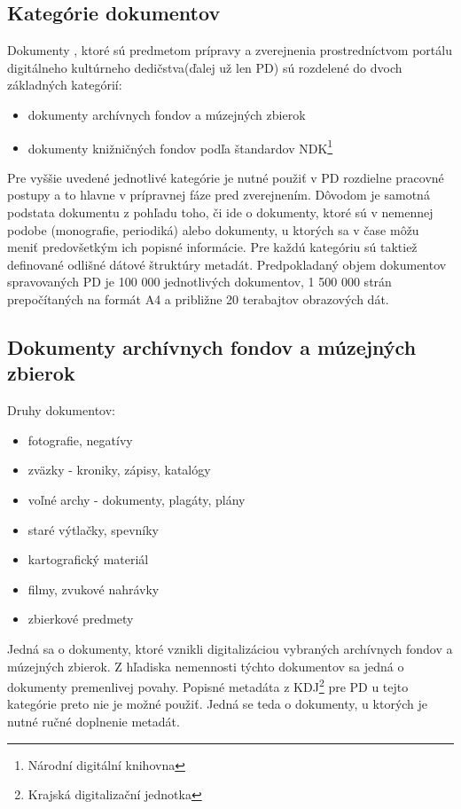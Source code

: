 \documentclass[
  digital, %
  table,   %
  lof,     %
  lot,     %
]{fithesis3}
\begin{document}
\subsection{Kategórie dokumentov}
Dokumenty , ktoré sú predmetom prípravy a zverejnenia prostredníctvom portálu digitálneho kultúrneho dedičstva(ďalej už len PD) sú rozdelené do dvoch základných kategórií:
\begin{itemize}
	\item dokumenty archívnych fondov a múzejných zbierok				
	\item dokumenty knižničných fondov podľa štandardov NDK\footnote{Národní digitální knihovna}
\end{itemize}
Pre vyššie uvedené jednotlivé kategórie je nutné použiť v PD rozdielne pracovné postupy a to hlavne v prípravnej fáze pred zverejnením. Dôvodom je samotná podstata dokumentu z pohľadu toho, či ide o dokumenty, ktoré sú v nemennej podobe (monografie, periodiká) alebo dokumenty, u ktorých sa v čase môžu meniť predovšetkým ich popisné informácie. Pre každú kategóriu sú taktiež definované odlišné dátové štruktúry metadát. Predpokladaný objem dokumentov spravovaných PD je 100 000 jednotlivých dokumentov, 1 500 000 strán prepočítaných na formát A4 a približne 20 terabajtov obrazových dát.
\subsection{Dokumenty archívnych fondov a múzejných zbierok}
Druhy dokumentov:
\begin{itemize}
	\item fotografie, negatívy				
	\item zväzky - kroniky, zápisy, katalógy
	\item voľné archy - dokumenty, plagáty, plány
	\item staré výtlačky, spevníky
	\item kartografický materiál 
	\item filmy, zvukové nahrávky 
	\item zbierkové predmety	
\end{itemize}
Jedná sa o dokumenty, ktoré vznikli digitalizáciou vybraných archívnych fondov a múzejných zbierok. Z hľadiska nemennosti týchto dokumentov sa jedná o dokumenty premenlivej povahy. Popisné metadáta z KDJ\footnote{Krajská digitalizační jednotka} pre PD u tejto kategórie preto nie je možné použiť. Jedná se teda o dokumenty, u ktorých je nutné ručné doplnenie metadát. 
\end{document}
